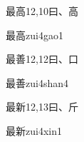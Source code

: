 \begin{entry}{最高}{12,10}{⽈、⾼}
  \begin{phonetics}{最高}{zui4gao1}
  \end{phonetics}
\end{entry}

\begin{entry}{最善}{12,12}{⽈、⼝}
  \begin{phonetics}{最善}{zui4shan4}
  \end{phonetics}
\end{entry}

\begin{entry}{最新}{12,13}{⽈、⽄}
  \begin{phonetics}{最新}{zui4xin1}
  \end{phonetics}
\end{entry}


